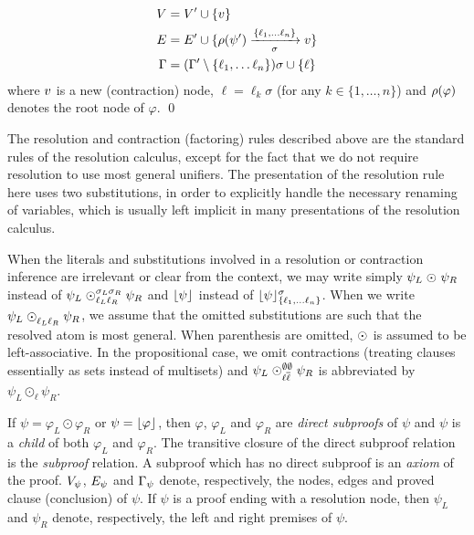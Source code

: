 \begin{definition}
\begin{itemize}
    \begin{align*}
      V &= V' \cup \{\n \} \\
      E &= E' \cup \{ \raiz{\psi'} \xrightarrow[\sigma]{\{\ell_1, \ldots \ell_n\}} \n \} \\
     \Gamma &= (\clause' \setminus \{ \ell_1, \ldots \ell_n \} ) \sigma \cup \{ \ell \}
    \end{align*}
    where $\n$ is a new (contraction) node, $\ell = \ell_k \sigma$ (for any $k \in \{1,\ldots, n\}$) and $\raiz{\varphi}$ denotes the root node of $\varphi$.
  \qed
\end{itemize}
\end{definition}


\noindent
The resolution and contraction (factoring) rules described above are the standard rules of the resolution calculus, except for the fact that we do not require resolution to use most general unifiers. The presentation of the resolution rule here uses two substitutions, in order to explicitly handle the necessary renaming of variables, which is usually left implicit in many presentations of the resolution calculus.

When the literals and substitutions involved in a resolution or contraction inference are irrelevant or clear from the context, we may write simply $\psi_L \res{}{}{}{} \psi_R$ instead of $\psi_L \res{\ell_L}{\sigma_L}{\ell_R}{\sigma_R} \psi_R$ and $\con{\psi}{}{}$ instead of $\con{\psi}{\{\ell_1, \ldots \ell_n\}}{\sigma}$. When we write $\psi_L \res{\ell_L}{}{\ell_R}{} \psi_R$, we assume that the omitted substitutions are such that the resolved atom is most general.
When parenthesis are omitted, $\res{}{}{}{}$ is assumed to be left-associative. In the propositional case, we omit contractions (treating clauses essentially as sets instead of multisets) and $\psi_L \res{\ell}{\emptyset}{\dual{\ell}}{\emptyset} \psi_R$ is abbreviated by $\psi_L \odot_{\ell} \psi_R$.

If $\psi = \varphi_L \odot \varphi_R$ or $\psi = \con{\varphi}{}{}$, then $\varphi$, $\varphi_L$ and $\varphi_R$ are \emph{direct
subproofs} of $\psi$ and $\psi$ is a \emph{child} of both $\varphi_L$ and $\varphi_R$. The
transitive closure of the direct subproof relation is the \emph{subproof} relation. A subproof which
has no direct subproof is an \emph{axiom} of the proof.
%
$\Vertices{\psi}$, $\Edges{\psi}$ and $\Conclusion{\psi}$
denote, respectively, the nodes, edges and proved clause (conclusion) of $\psi$. If $\psi$ is a proof ending with a resolution node, then $\psi_L$ and $\psi_R$ denote, respectively, the left and right premises of $\psi$.
